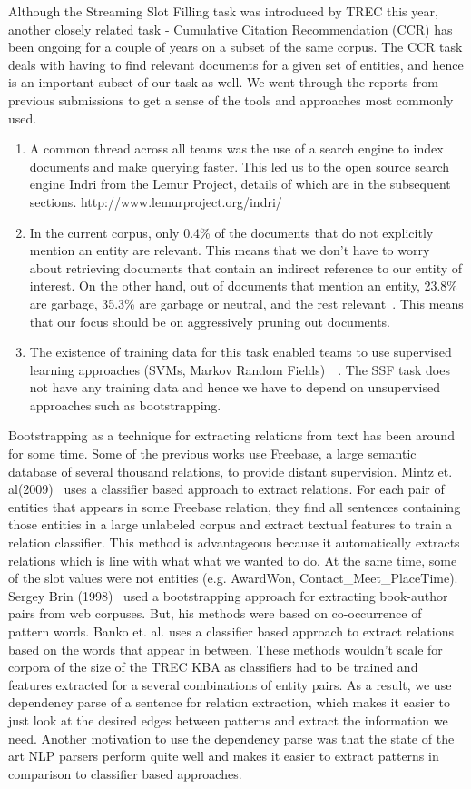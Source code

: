 Although the Streaming Slot Filling task was introduced by TREC this year, another closely related task - Cumulative Citation Recommendation (CCR) has been ongoing for a couple of years on a subset of the same corpus. The CCR task deals with having to find relevant documents for a given set of entities, and hence is an important subset of our task as well. We went through the reports from previous submissions to get a sense of the tools and approaches most commonly used. 
\begin{enumerate}
\item A common thread across all teams was the use of a search engine to index documents and make querying faster. This led us to the open source search engine Indri from the Lemur Project, details of which are in the subsequent sections. http://www.lemurproject.org/indri/
\item In the current corpus, only 0.4\% of the documents that do not explicitly mention an entity are relevant. This means that we don’t have to worry about retrieving documents that contain an indirect reference to our entity of interest. On the other hand, out of documents that mention an entity, 23.8\% are garbage, 35.3\% are garbage or neutral, and the rest relevant~\cite{gebre}. This means  that our focus should be on aggressively pruning out documents.
\item The existence of training data for this task enabled teams to use supervised learning approaches (SVMs, Markov Random Fields)~\cite{dalton}~\cite{kjersten}. The SSF task does not have any training data and hence we have to depend on unsupervised approaches such as bootstrapping. 
\end{enumerate}

Bootstrapping as a technique for extracting relations from text has been around for some time. Some of the previous works use Freebase, a large semantic database of several thousand relations, to provide distant supervision. Mintz et. al(2009)~\cite{mintz} uses a classifier based approach to extract relations. For each pair of entities that appears in some Freebase relation, they find all sentences containing those entities in a large unlabeled corpus and extract textual features to train a relation classiﬁer. This method is advantageous because it automatically extracts relations which is line with what what we wanted to do. At the same time, some of the slot values were not entities (e.g. AwardWon, Contact\_Meet\_PlaceTime). Sergey Brin (1998)~\cite{brin} used a bootstrapping approach for extracting book-author pairs from web corpuses. But, his methods were based on co-occurrence of pattern words. Banko et. al. uses a classifier based approach to extract relations based on the words that appear in between. These methods wouldn’t scale for corpora of the size of the TREC KBA as classifiers had to be trained and features extracted for a several combinations of entity pairs. As a result, we use dependency parse of a sentence for relation extraction, which makes it easier to just look at the desired edges between patterns and extract the information we need. Another motivation to use the dependency parse was that the state of the art NLP parsers perform quite well and makes it easier to extract patterns in comparison to classifier based approaches.

